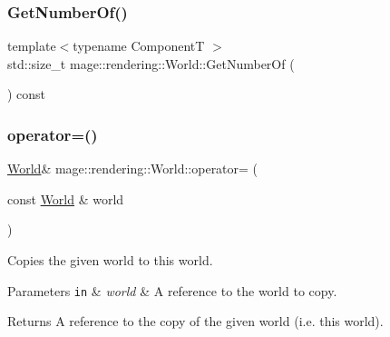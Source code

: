 \mbox{\label{classmage_1_1rendering_1_1_world_a6bf09acab1791a6ebd6b46e5862f6373}} 
\subsubsection{\texorpdfstring{Get\+Number\+Of()}{GetNumberOf()}}
{\footnotesize\ttfamily template$<$typename ComponentT $>$ \\
std\+::size\+\_\+t mage\+::rendering\+::\+World\+::\+Get\+Number\+Of (\begin{DoxyParamCaption}{ }\end{DoxyParamCaption}) const\hspace{0.3cm}{\ttfamily [noexcept]}}

\mbox{\label{classmage_1_1rendering_1_1_world_aff83cf89dc28c141ca7b7a0cbc28e2ae}} 
\subsubsection{\texorpdfstring{operator=()}{operator=()}\hspace{0.1cm}{\footnotesize\ttfamily [1/2]}}
{\footnotesize\ttfamily \mbox{\hyperlink{classmage_1_1rendering_1_1_world}{World}}\& mage\+::rendering\+::\+World\+::operator= (\begin{DoxyParamCaption}\item[{const \mbox{\hyperlink{classmage_1_1rendering_1_1_world}{World}} \&}]{world }\end{DoxyParamCaption})\hspace{0.3cm}{\ttfamily [delete]}}

Copies the given world to this world.


\begin{DoxyParams}[1]{Parameters}
\mbox{\tt in}  & {\em world} & A reference to the world to copy. \\
\hline
\end{DoxyParams}
\begin{DoxyReturn}{Returns}
A reference to the copy of the given world (i.\+e. this world). 
\end{DoxyReturn}
\mbox{\label{classmage_1_1rendering_1_1_world_a7f44f10905070997553a7c7ad90ddcb2}} 
